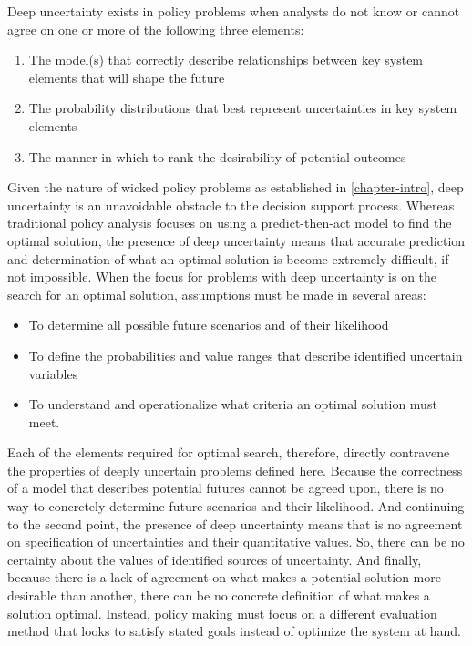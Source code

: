\begin{conceptbox}\label{def:deepuncertainty}
    Deep uncertainty exists in policy problems when analysts do not know or cannot agree on one or more of the following three elements:
    \newline
    \begin{enumerate}[leftmargin=*]
        \item The model(s) that correctly describe relationships between key system elements that will shape the future
        \item The probability distributions that best represent uncertainties in key system elements
        \item The manner in which to rank the desirability of potential outcomes
    \end{enumerate}
\end{conceptbox}

Given the nature of wicked policy problems as established in \cref{chapter-intro}, deep uncertainty is an unavoidable obstacle to the decision support process. Whereas traditional policy analysis focuses on using a predict-then-act model to find the optimal solution, the presence of deep uncertainty means that accurate prediction and determination of what an optimal solution is become extremely difficult, if not impossible. When the focus for problems with deep uncertainty is on the search for an optimal solution, assumptions must be made in several areas: 

\begin{itemize}
    \item To determine all possible future scenarios and of their likelihood
    \item To define the probabilities and value ranges that describe identified uncertain variables
    \item To understand and operationalize what criteria an optimal solution must meet. 
\end{itemize}

Each of the elements required for optimal search, therefore, directly contravene the properties of deeply uncertain problems defined here. Because the correctness of a model that describes potential futures cannot be agreed upon, there is no way to concretely determine future scenarios and their likelihood. And continuing to the second point, the presence of deep uncertainty means that is no agreement on specification of uncertainties and their quantitative values. So, there can be no certainty about the values of identified sources of uncertainty. And finally, because there is a lack of agreement on what makes a potential solution more desirable than another, there can be no concrete definition of what makes a solution optimal. Instead, policy making must focus on a different evaluation method that looks to satisfy stated goals instead of optimize the system at hand. 

